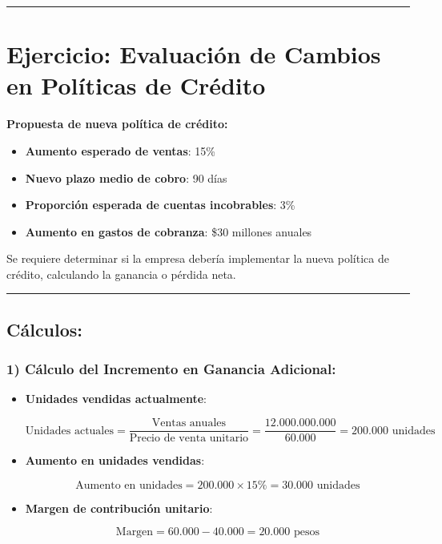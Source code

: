 \documentclass[
  letterpaper,
  DIV=11,
  numbers=noendperiod]{scrartcl}
\providecommand{\tightlist}{%
  \setlength{\itemsep}{0pt}\setlength{\parskip}{0pt}}\usepackage{longtable,booktabs,array}
\begin{document}
\begin{center}\rule{0.5\linewidth}{0.5pt}\end{center}

\section{Ejercicio: Evaluación de Cambios en Políticas de
Crédito}\label{ejercicio-evaluaciuxf3n-de-cambios-en-poluxedticas-de-cruxe9dito-2}

\textbf{Propuesta de nueva política de crédito:}

\begin{itemize}
\tightlist
\item
  \textbf{Aumento esperado de ventas}: 15\%
\item
  \textbf{Nuevo plazo medio de cobro}: 90 días
\item
  \textbf{Proporción esperada de cuentas incobrables}: 3\%
\item
  \textbf{Aumento en gastos de cobranza}: \$30 millones anuales
\end{itemize}

Se requiere determinar si la empresa debería implementar la nueva
política de crédito, calculando la ganancia o pérdida neta.

\begin{center}\rule{0.5\linewidth}{0.5pt}\end{center}

\subsection{Cálculos:}\label{cuxe1lculos-1}

\subsubsection{1) Cálculo del Incremento en Ganancia
Adicional:}\label{cuxe1lculo-del-incremento-en-ganancia-adicional}

\begin{itemize}
\item
  \textbf{Unidades vendidas actualmente}:

  \[
  \text{Unidades actuales} = \frac{\text{Ventas anuales}}{\text{Precio de venta unitario}} = \frac{12.000.000.000}{60.000} = 200.000 \text{ unidades}
  \]
\item
  \textbf{Aumento en unidades vendidas}:

  \[
  \text{Aumento en unidades} = 200.000 \times 15\% = 30.000 \text{ unidades}
  \]
\item
  \textbf{Margen de contribución unitario}:

  \[
  \text{Margen} = 60.000 - 40.000 = 20.000 \text{ pesos}
  \]
\end{itemize}
\end{document}

